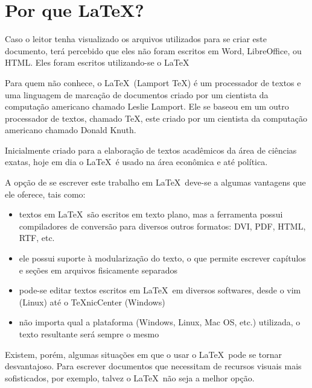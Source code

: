 \section*{Por que \LaTeX?}

Caso o leitor tenha visualizado os arquivos utilizados para se criar este documento, ter\'a percebido que eles n\~ao foram escritos em Word, LibreOffice, ou HTML. Eles foram escritos utilizando-se o \LaTeX\
 
Para quem n\~ao conhece, o \LaTeX\ (Lamport TeX) \'e um processador de textos e uma linguagem de marca\c c\~ao de documentos criado por um cientista da computa\c c\~ao americano chamado Leslie Lamport. Ele se baseou em um outro processador de textos, chamado TeX, este criado por um cientista da computa\c c\~ao americano chamado Donald Knuth. 

Inicialmente criado para a elabora\c c\~ao de textos acad\^emicos da \'area de ci\^encias exatas, hoje em dia o \LaTeX\ \'e usado na \'area econ\^omica e at\'e pol\'itica.

A op\c c\~ao de se escrever este trabalho em \LaTeX\ deve-se a algumas vantagens que ele oferece, tais como:

\begin{itemize}
\item textos em \LaTeX\ s\~ao escritos em texto plano, mas a ferramenta possui compiladores de convers\~ao para diversos outros formatos: DVI, PDF, HTML, RTF, etc.
\item ele possui suporte \`a modulariza\c c\~ao do texto, o que permite escrever cap\'itulos e se\c c\~oes em arquivos fisicamente separados
\item pode-se editar textos escritos em \LaTeX\ em diversos softwares, desde o vim (Linux) at\'e o TeXnicCenter (Windows)
\item n\~ao importa qual a plataforma (Windows, Linux, Mac OS, etc.) utilizada, o texto resultante ser\'a sempre o mesmo
\end{itemize}

Existem, por\'em, algumas situa\c c\~oes em que o usar o \LaTeX\ pode se tornar desvantajoso. Para escrever documentos que necessitam de recursos visuais mais sofisticados, por exemplo, talvez o \LaTeX\ n\~ao seja a melhor op\c c\~ao.
